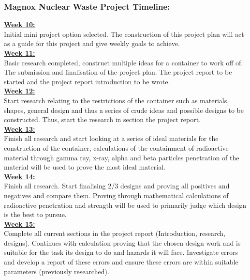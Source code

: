 \subsubsection*{Magnox Nuclear Waste Project Timeline:}
\label{Magnox Nuclear Waste Project Timeline SubSubSection}
\vspace{0.2cm}

\textbf{\underline{Week 10:}} \\ [0.2cm]
Initial mini project option selected. The construction of this project plan will act as a guide for this project and give weekly goals to achieve.\\ 

\textbf{\underline{Week 11:}} \\ [0.2cm]
Basic research completed, construct multiple ideas for a container to work off of. The submission and finalisation of the project plan. The project report to be started and the project report introduction to be wrote.\\

\textbf{\underline{Week 12:}} \\ [0.2cm]
Start research relating to the restrictions of the container such as materials, shapes, general design and thus a series of crude ideas and possible designs to be constructed. Thus, start the research in section the project report.\\

\textbf{\underline{Week 13:}} \\ [0.2cm]
Finish all research and start looking at a series of ideal materials for the construction of the container, calculations of the containment of radioactive material through gamma ray, x-ray, alpha and beta particles penetration of the material will be used to prove the most ideal material.\\

\textbf{\underline{Week 14:}} \\ [0.2cm]
Finish all research. Start finalising 2/3 designs and proving all positives and negatives and compare them. Proving through mathematical calculations of radioactive penetration and strength will be used to primarily judge which design is the best to pursue.\\

\textbf{\underline{Week 15:}} \\ [0.2cm]
Complete all current sections in the project report (Introduction, research, designs). Continues with calculation proving that the chosen design work and is suitable for the task its design to do and hazards it will face. Investigate errors and develop a report of these errors and ensure these errors are within suitable parameters (previously researched).\\

